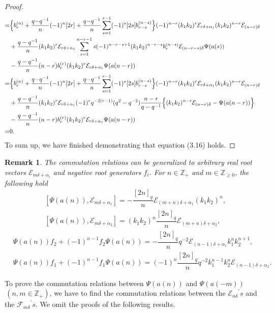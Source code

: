 \documentclass[12pt]{amsart}
\newtheorem{remark}[theorem]{Remark}
\numberwithin{equation}{section}
\numberwithin{equation}{section}
\begin{document}
\begin{proof}
\begin{align*}
=&\Bigl\{b^{(n)}_r+\dfrac{q{-}q^{-1}}{n}(-1)^{n}[2r]+\dfrac{q{-}q^{-1}}{n}\sum\limits_{s=1}^{r-1}(-1)^{s}[2s]b^{(n-s)}_{r-s}\Bigr\}(-1)^{n-r}(k_1k_2)^r\mathcal{E}_{r\delta+\alpha_1}(k_1k_2)^{n-r}\mathcal{E}_{(n-r)\delta}\\
&+\dfrac{q-q^{-1}}{n}(k_1k_2)^r\mathcal{E}_{r\delta+\alpha_1}\sum\limits_{s=1}^{n-r-1}s(-1)^{n-r-s+1}(k_1k_2)^{n-r-s}b^{(n-s)}_r\mathcal{E}_{(n-r-s)\delta}\Psi(a(s))\\
&-\dfrac{q-q^{-1}}{n}(n-r)b^{(r)}_r(k_1k_2)^r\mathcal{E}_{r\delta+\alpha_1}\Psi(a(n-r))
\\
=&\Bigl\{b^{(n)}_r+\dfrac{q{-}q^{-1}}{n}(-1)^{n}[2r]+\dfrac{q{-}q^{-1}}{n}\sum\limits_{s=1}^{r-1}(-1)^{s}[2s]b^{(n-s)}_{r-s}\Bigr\}(-1)^{n-r}(k_1k_2)^r\mathcal{E}_{r\delta+\alpha_1}(k_1k_2)^{n-r}\mathcal{E}_{(n-r)\delta}\\
&+\dfrac{q-q^{-1}}{n}(k_1k_2)^r\mathcal{E}_{r\delta+\alpha_1}
(-1)^rq^{-2(r-1)}(q^2-q^{-2})\dfrac{n-r}{q-q^{-1}}\Bigl\{(k_1k_2)^{n-r}\mathcal{E}_{(n-r)\delta}-\Psi(a(n-r))\Bigr\}
\\
&-\dfrac{q-q^{-1}}{n}(n-r)b^{(r)}_r(k_1k_2)^r\mathcal{E}_{r\delta+\alpha_1}\Psi(a(n-r))\\
=&0.
\end{align*}
To sum up, we have finished demonstrating that equation (3.16) holds.
\end{proof}

\begin{remark}
The commutation relations can be generalized to arbitrary real root vectors \(\mathcal{E}_{m\delta+\alpha_i}\) and negative root generators \(f_i\). For \(n \in \mathbb{Z}_{+}\) and \(m \in \mathbb{Z}_{\ge 0}\), the following hold
\begin{align}
&[\Psi(a(n)), \mathcal{E}_{m\delta+\alpha_1}] = -\dfrac{[2n]_q}{n} \mathcal{E}_{(m+n)\delta+\alpha_1}(k_1k_2)^n,\\
&[\Psi(a(n)), \mathcal{E}_{m\delta+\alpha_2}] = (k_1k_2)^n\dfrac{[2n]_q}{n} \mathcal{E}_{(m+n)\delta+\alpha_2},
\end{align}
\begin{align}
&\Psi(a(n))f_2 + (-1)^{n-1}f_2\Psi(a(n)) = -\dfrac{[2n]_q}{n}q^{-2}\mathcal{E}_{(n-1)\delta+\alpha_1}k^n_1k^{n+1}_2,
\\
&\Psi(a(n))f_1 + (-1)^{n-1}f_1\Psi(a(n)) = (-1)^{n}\dfrac{[2n]_q}{n}q^{-2}k^{n-1}_1k^{n}_2\mathcal{E}_{(n-1)\delta+\alpha_2}.
\end{align}
\end{remark}

To prove the commutation relations between \(\Psi(a(n))\) and \(\Psi(a(-m))\)\(\,(n,m\in\mathbb{Z}_+)\),  we have to find the commutation relations between the \({\mathcal{E}_{n\delta}}^{\prime}s\) and the \({\mathcal{F}_{m\delta}}^{\prime}s\). 
We omit the proofs of the following results.
\end{document}
